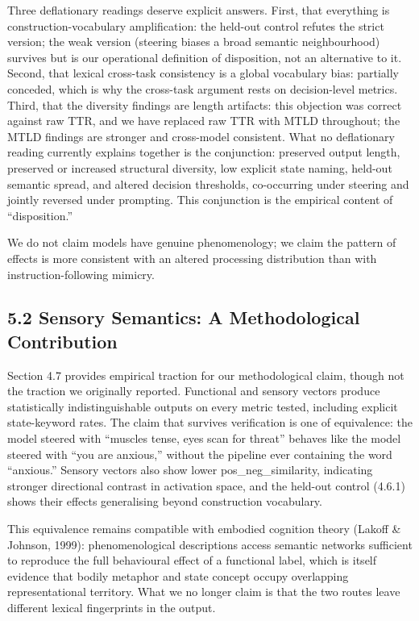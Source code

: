 \documentclass[11pt,a4paper]{article}
\begin{document}
Three deflationary readings deserve explicit answers. First, that everything is construction-vocabulary amplification: the held-out control refutes the strict version; the weak version (steering biases a broad semantic neighbourhood) survives but is our operational definition of disposition, not an alternative to it. Second, that lexical cross-task consistency is a global vocabulary bias: partially conceded, which is why the cross-task argument rests on decision-level metrics. Third, that the diversity findings are length artifacts: this objection was correct against raw TTR, and we have replaced raw TTR with MTLD throughout; the MTLD findings are stronger and cross-model consistent. What no deflationary reading currently explains together is the conjunction: preserved output length, preserved or increased structural diversity, low explicit state naming, held-out semantic spread, and altered decision thresholds, co-occurring under steering and jointly reversed under prompting. This conjunction is the empirical content of ``disposition.''

We do not claim models have genuine phenomenology; we claim the pattern of effects is more consistent with an altered processing distribution than with instruction-following mimicry.

\subsection*{5.2 Sensory Semantics: A Methodological Contribution}

Section 4.7 provides empirical traction for our methodological claim, though not the traction we originally reported. Functional and sensory vectors produce statistically indistinguishable outputs on every metric tested, including explicit state-keyword rates. The claim that survives verification is one of equivalence: the model steered with ``muscles tense, eyes scan for threat'' behaves like the model steered with ``you are anxious,'' without the pipeline ever containing the word ``anxious.'' Sensory vectors also show lower pos\_neg\_similarity, indicating stronger directional contrast in activation space, and the held-out control (4.6.1) shows their effects generalising beyond construction vocabulary.

This equivalence remains compatible with embodied cognition theory (Lakoff \& Johnson, 1999): phenomenological descriptions access semantic networks sufficient to reproduce the full behavioural effect of a functional label, which is itself evidence that bodily metaphor and state concept occupy overlapping representational territory. What we no longer claim is that the two routes leave different lexical fingerprints in the output.
\end{document}
